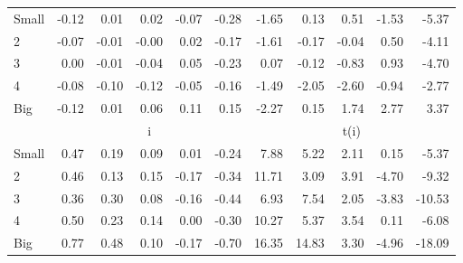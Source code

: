 \begin{table}[!ht]
\begin{tabular}{lrrrrrrrrrr}
    \\
      \cmidrule(r){2-6} \cmidrule(r){7-11}

    Small   & -0.12  & 0.01  & 0.02  & -0.07  & -0.28  & -1.65  & 0.13  & 0.51  & -1.53  & -5.37  \\
         2  & -0.07  & -0.01  & -0.00  & 0.02  & -0.17  & -1.61  & -0.17  & -0.04  & 0.50  & -4.11  \\
         3  & 0.00  & -0.01  & -0.04  & 0.05  & -0.23  & 0.07  & -0.12  & -0.83  & 0.93  & -4.70  \\
         4  & -0.08  & -0.10  & -0.12  & -0.05  & -0.16  & -1.49  & -2.05  & -2.60  & -0.94  & -2.77  \\
    Big     & -0.12  & 0.01  & 0.06  & 0.11  & 0.15  & -2.27  & 0.15  & 1.74  & 2.77  & 3.37  \\

  
    
      & \multicolumn{5}{c}{i} & \multicolumn{5}{c}{t(i)}
    
    \\
      \cmidrule(r){2-6} \cmidrule(r){7-11}

    Small   & 0.47  & 0.19  & 0.09  & 0.01  & -0.24  & 7.88  & 5.22  & 2.11  & 0.15  & -5.37  \\
         2  & 0.46  & 0.13  & 0.15  & -0.17  & -0.34  & 11.71  & 3.09  & 3.91  & -4.70  & -9.32  \\
         3  & 0.36  & 0.30  & 0.08  & -0.16  & -0.44  & 6.93  & 7.54  & 2.05  & -3.83  & -10.53  \\
         4  & 0.50  & 0.23  & 0.14  & 0.00  & -0.30  & 10.27  & 5.37  & 3.54  & 0.11  & -6.08  \\
    Big     & 0.77  & 0.48  & 0.10  & -0.17  & -0.70  & 16.35  & 14.83  & 3.30  & -4.96  & -18.09  \\

  

  \bottomrule
\end{tabular}
\label{tbl:25_Size_Inv_FF2016}
\end{table}